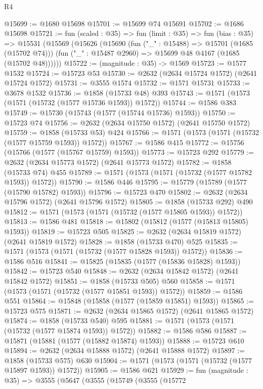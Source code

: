 \begin{lexlean}{R4}
\begin{coremodule}
@15699 := @1680 @15698
@15701 := @15699 @74 @15691
@15702 := @1686 @15698
@15721 := fun (scaled : @35) =>
  fun (limit : @35) =>
  fun (bias : @35) =>
  @15531
    (@15569
      (@15626
        (@15690
          (fun ("_" : @15488) => @15701 (@1685 (@15702 @74)))
          (fun ("_" : @15487 @2960) => @15699 @48 @4167 (@1685 (@15702 @48))))))
@15722 := (magnitude : @35) -> @1569
@15723 := @1577 @1532
@15724 := @15723 @53
@15730 := @2632 (@2634 @15724 @1572) (@2641 @15724 @1572)
@15731 := @3555 @1574
@15732 := @1571 @15731
@15733 := @3678 @1532
@15736 := @1858 (@15733 @48) @393
@15743 := @1571 (@1573 (@1571 (@15732 (@1577 @15736 @1593)) @1572))
@15744 := @1586 @383
@15749 := @15730 (@15743 (@1577 (@15744 @15736) @1593))
@15750 := @15723 @74
@15756 := @2632 (@2634 @15750 @1572) (@2641 @15750 @1572)
@15759 := @1858 (@15733 @53) @424
@15766 := @1571 (@1573 (@1571 (@15732 (@1577 @15759 @1593)) @1572))
@15767 := @1586 @415
@15772 := @15756 (@15766 (@1577 (@15767 @15759) @1593))
@15773 := @15723 @292
@15779 := @2632 (@2634 @15773 @1572) (@2641 @15773 @1572)
@15782 := @1858 (@15733 @74) @455
@15789 := @1571 (@1573 (@1571 (@15732 (@1577 @15782 @1593)) @1572))
@15790 := @1586 @446
@15795 := @15779 (@15789 (@1577 (@15790 @15782) @1593))
@15796 := @15723 @470
@15802 := @2632 (@2634 @15796 @1572) (@2641 @15796 @1572)
@15805 := @1858 (@15733 @292) @490
@15812 := @1571 (@1573 (@1571 (@15732 (@1577 @15805 @1593)) @1572))
@15813 := @1586 @481
@15818 := @15802 (@15812 (@1577 (@15813 @15805) @1593))
@15819 := @15723 @505
@15825 := @2632 (@2634 @15819 @1572) (@2641 @15819 @1572)
@15828 := @1858 (@15733 @470) @525
@15835 := @1571 (@1573 (@1571 (@15732 (@1577 @15828 @1593)) @1572))
@15836 := @1586 @516
@15841 := @15825 (@15835 (@1577 (@15836 @15828) @1593))
@15842 := @15723 @540
@15848 := @2632 (@2634 @15842 @1572) (@2641 @15842 @1572)
@15851 := @1858 (@15733 @505) @560
@15858 := @1571 (@1573 (@1571 (@15732 (@1577 @15851 @1593)) @1572))
@15859 := @1586 @551
@15864 := @15848 (@15858 (@1577 (@15859 @15851) @1593))
@15865 := @15723 @575
@15871 := @2632 (@2634 @15865 @1572) (@2641 @15865 @1572)
@15874 := @1858 (@15733 @540) @595
@15881 := @1571 (@1573 (@1571 (@15732 (@1577 @15874 @1593)) @1572))
@15882 := @1586 @586
@15887 := @15871 (@15881 (@1577 (@15882 @15874) @1593))
@15888 := @15723 @610
@15894 := @2632 (@2634 @15888 @1572) (@2641 @15888 @1572)
@15897 := @1858 (@15733 @575) @630
@15904 := @1571 (@1573 (@1571 (@15732 (@1577 @15897 @1593)) @1572))
@15905 := @1586 @621
@15929 := fun (magnitude : @35) =>
  @3555
    (@5647
      (@3555
        (@15749
          (@3555
            (@15772

\end{coremodule}
\end{lexlean}
